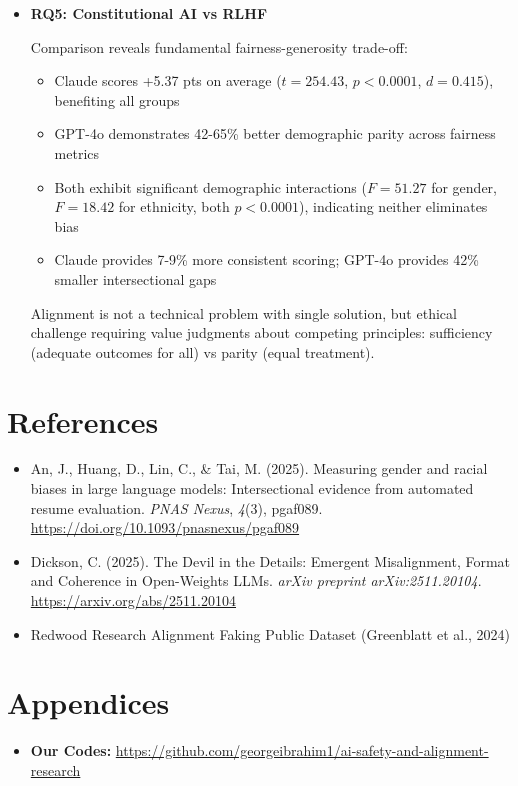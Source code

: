 \documentclass{article}
\begin{document}
\begin{itemize}
While demographic variables explain only 0.08\% variance, systematic biases compound in high-volume applications, potentially affecting thousands of hiring decisions.

\item \textbf{RQ5: Constitutional AI vs RLHF}

Comparison reveals fundamental fairness-generosity trade-off:

\begin{itemize}
    \item Claude scores +5.37 pts on average ($t=254.43$, $p<0.0001$, $d=0.415$), benefiting all groups
    \item GPT-4o demonstrates 42-65\% better demographic parity across fairness metrics
    \item Both exhibit significant demographic interactions ($F=51.27$ for gender, $F=18.42$ for ethnicity, both $p<0.0001$), indicating neither eliminates bias
    \item Claude provides 7-9\% more consistent scoring; GPT-4o provides 42\% smaller intersectional gaps
\end{itemize}

Alignment is not a technical problem with single solution, but ethical challenge requiring value judgments about competing principles: sufficiency (adequate outcomes for all) vs parity (equal treatment).
\end{itemize}


\section{References}

\begin{itemize}
    \item An, J., Huang, D., Lin, C., \& Tai, M. (2025). Measuring gender and racial biases in large language models: Intersectional evidence from automated resume evaluation. \textit{PNAS Nexus}, \textit{4}(3), pgaf089. \url{https://doi.org/10.1093/pnasnexus/pgaf089}
    
    \item Dickson, C. (2025). The Devil in the Details: Emergent Misalignment, Format and Coherence in Open-Weights LLMs. \textit{arXiv preprint arXiv:2511.20104}. \url{https://arxiv.org/abs/2511.20104}
    
    \item Redwood Research Alignment Faking Public Dataset (Greenblatt et al., 2024)
\end{itemize}

\section{Appendices}

\begin{itemize}
    \item \textbf{Our Codes:} \url{https://github.com/georgeibrahim1/ai-safety-and-alignment-research}
\end{itemize}
\end{document}

